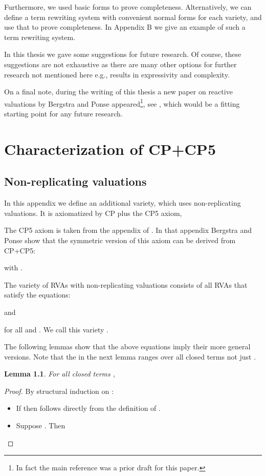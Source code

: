 \documentclass[a4paper,twoside,openright]{report}
\newtheorem{lem}[theorem]{Lemma}
\begin{document}
Furthermore, we used basic forms to prove completeness. Alternatively, we can define a term rewriting system with convenient normal forms for each variety, and use that to prove completeness. In Appendix B we give an example of such a term rewriting system. 

In this thesis we gave some suggestions for future research. Of course, these suggestions are not exhaustive as there are many other options for further research not mentioned here e.g., results in expressivity and complexity.

On a final note, during the writing of this thesis a new paper on reactive valuations by Bergstra and Ponse appeared\footnote{In fact the main reference \cite{main} was a prior draft for this paper.}, see \cite{future}, which would be a fitting starting point for any future research.

\appendix

\chapter{Characterization of CP+CP5}

\section{Non-replicating valuations}
In this appendix we define an additional variety, which uses non-replicating valuations. It is axiomatized by CP plus the CP5 axiom,

The CP5 axiom is taken from the appendix of \cite{main}. In that appendix Bergstra and Ponse show that the symmetric version of this axiom can be derived from CP+CP5:

with .

The variety of RVAs with non-replicating valuations consists of all RVAs that satisfy the
equations:

and

for all  and . We call this variety .

The following lemmas show that the above equations imply their more general versions. Note that the  in the next lemma ranges over all closed terms not just .

\begin{lem}\label{char lem one}
For all closed terms ,

\end{lem}
\begin{proof} By structural induction on :
\begin{itemize}
\item If  then  follows directly from the definition of .
\item Suppose . Then

\end{itemize}
\end{proof}
\end{document}
